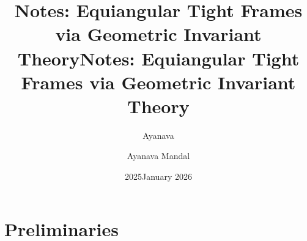 \documentclass[11pt,letterpaper]{book}
\title{Notes: Equiangular Tight Frames via Geometric Invariant Theory}
\author{Ayanava}
\date{2025}
\title{\textbf{Notes: Equiangular Tight Frames via Geometric Invariant Theory}}
\author{\Large Ayanava Mandal}
\date{January 2026}
\begin{document}
        \maketitle
        \tableofcontents
		\chapter{Preliminaries}
        
        
        \clearpage
		
\end{document}
